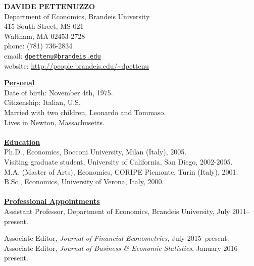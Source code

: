 \documentclass[11pt]{article}
\begin{document}
\begin{center}
\textbf{DAVIDE PETTENUZZO} \\
Department of Economics, Brandeis University \\
415 South Street, MS 021 \\
Waltham, MA 02453-2728 \\
phone: (781) 736-2834 \\
email: \href{mailto:dpettenu@brandeis.edu}{\nolinkurl{dpettenu@brandeis.edu}} \\
website: \url{http://people.brandeis.edu/~dpettenu} \\
\end{center}
\hline 
\bigskip

\underline{\textbf{Personal}}\\
Date of birth: November 4th, 1975. \\
Citizenship: Italian, U.S. \\
Married with two children, Leonardo and Tommaso. \\
Lives in Newton, Massachusetts. \\ \\ 
\underline{\textbf{Education}}\\
Ph.D., Economics, Bocconi University, Milan (Italy), 2005.\\
Visiting graduate student, University of California, San Diego, 2002-2005. \\
M.A. (Master of Arts), Economics, CORIPE Piemonte, Turin (Italy), 2001. \\
B.Sc., Economics, University of Verona, Italy, 2000.\\ \\
\underline{\textbf{Professional Appointments}}\\
Assistant Professor, Department of Economics, Brandeis University, July 2011--present.

Associate Editor, \textit{Journal of Financial Econometrics}, July 2015--present. \\
Associate Editor, \textit{Journal of Business \& Economic Statistics}, January 2016--present.
\end{document}
